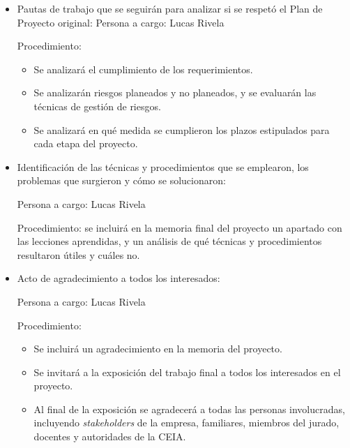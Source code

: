 \documentclass[
11pt, %
]{charter}
\begin{document}
\begin{itemize}
	\item Pautas de trabajo que se seguirán para analizar si se respetó el Plan de Proyecto original:
	Persona a cargo: Lucas Rivela
	
	Procedimiento:
	\begin{itemize}
		\item Se analizará el cumplimiento de los requerimientos.
		\item Se analizarán riesgos planeados y no planeados, y se evaluarán las técnicas de gestión de riesgos.
		\item Se analizará en qué medida se cumplieron los plazos estipulados para cada etapa del proyecto.
	\end{itemize}
	
	\item Identificación de las técnicas y procedimientos que se emplearon, los problemas que surgieron y cómo se solucionaron:
	
	Persona a cargo: Lucas Rivela
	
	Procedimiento: se incluirá en la memoria final del proyecto un apartado con las lecciones aprendidas, y un análisis de qué técnicas y procedimientos resultaron útiles y cuáles no.
	
	\item Acto de agradecimiento a todos los interesados:
	
	Persona a cargo: Lucas Rivela
	
	Procedimiento: 
	\begin{itemize}
		\item Se incluirá un agradecimiento en la memoria del proyecto.
		\item Se invitará a la exposición del trabajo final a todos los interesados en el proyecto.
		\item Al final de la exposición se agradecerá a todas las personas involucradas, incluyendo \textit{stakeholders} de la empresa, familiares, miembros del jurado, docentes y autoridades de la CEIA.
	\end{itemize}		
	
\end{itemize}

\end{document}
